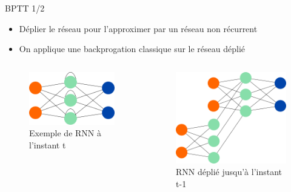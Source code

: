 \begin{frame}{BPTT 1/2}
	\begin{itemize}
		\item Déplier le réseau pour l'approximer par un réseau non récurrent 
		\item On applique une backprogation classique sur le réseau déplié
	\end{itemize}
    \begin{columns}
        \begin{column}{0.48\textwidth}
            \begin{figure}
                \includegraphics[width=.7\textwidth]{images/RNN_BPTT_ex}
                \caption{Exemple de RNN à l'instant t}
            \end{figure}
        \end{column}
        \begin{column}{0.48\textwidth}
            \begin{figure}
                \includegraphics[width=.7\textwidth]{images/RNN_BPTT_dep_ex}
                \caption{RNN déplié jusqu'à l'instant t-1}
            \end{figure}
        \end{column}
    \end{columns}	
\end{frame}


